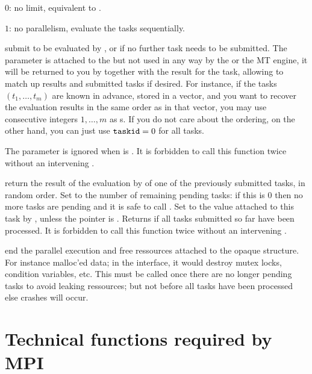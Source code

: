 {\item $0$: no limit, equivalent to .

\item $1$: no parallelism, evaluate the tasks sequentially.

 submit
 to be evaluated by , or  if no further task
needs to be submitted. The parameter  is attached to the
 but not used in any way by the  or the MT engine,
it will be returned to you by  together with the result
for the task, allowing to match up results and submitted tasks if desired.
For instance, if the tasks $(t_1,\dots, t_m)$ are known in advance, stored
in a vector, and you want to recover the evaluation results in the same order
as in that vector, you may use consecutive integers $1, \dots, m$ as
s. If you do not care about the ordering, on the other hand, you
can just use ${\tt taskid} = 0$ for all tasks.

The  parameter is ignored when  is . It is
forbidden to call this function twice without an intervening
.

return the result of the evaluation by  of one of the previously
submitted tasks, in random order. Set  to the number of
remaining pending tasks: if this is $0$ then no more tasks are pending and it
is safe to call . Set  to the value attached
to this task by , unless the  pointer is
. Returns  if all tasks submitted so far have been
processed. It is forbidden to call this function twice without an intervening
.

 end the parallel execution
and free ressources attached to the opaque  structure. For
instance malloc'ed data; in the  interface, it would destroy
mutex locks, condition variables, etc. This must be called once there are no
longer pending tasks to avoid leaking ressources; but not before all tasks
have been processed else crashes will occur.

\section{Technical functions required by MPI}

}
